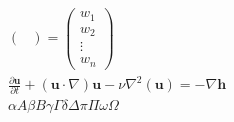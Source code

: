 \documentclass{article}
\begin{document}
\begin{gather*}
\begin{pmatrix}
        \end{pmatrix}
        =
        \begin{pmatrix}
            w_1\\w_2\\\vdots\\w_n
        \end{pmatrix}\\
        \frac{\partial\textbf{u}}{\partial t} + (\textbf{u} \cdot \nabla)\textbf{u} - \nu\nabla^2(\textbf{u}) = -\nabla\textbf{h}\\
        \alpha A\beta B\gamma\Gamma\delta\Delta\pi\Pi\omega\Omega\\
    \end{gather*} 
\end{document}
